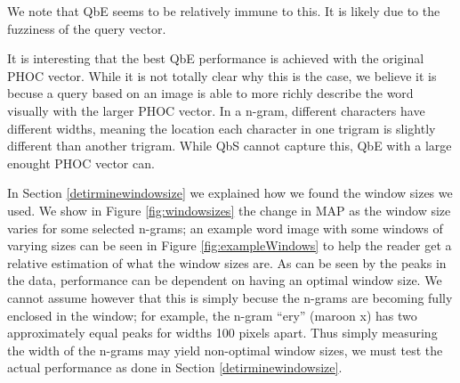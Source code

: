 \documentclass[ms,electronic,twosidetoc,letterpaper,chaptercenter,parttop,lof,lot]{byumsphd}
\begin{document}
We note that QbE seems to be relatively immune to this. It is likely due to the fuzziness of the query vector.


It is interesting that the best QbE performance is achieved with the original PHOC vector. While it is not totally clear why this is the case, we believe it is becuse a query based on an image is able to more richly describe the word visually with the larger PHOC vector. In a n-gram, different characters have different widths, meaning the location each character in one trigram is slightly different than another trigram. While QbS cannot capture this, QbE with a large enought PHOC vector can.



In Section \ref{detirminewindowsize} we explained how we found the window sizes we used. We show in Figure \ref{fig:windowsizes} the change in MAP as the window size varies for some selected n-grams; an example word image with some windows of varying sizes can be seen in Figure \ref{fig:exampleWindows} to help the reader get a relative estimation of what the window sizes are. As can be seen by the peaks in the data, performance can be dependent on having an optimal window size. We cannot assume however that this is simply becuse the n-grams are becoming fully enclosed in the window; for example, the n-gram ``ery'' (maroon x) has two approximately equal peaks for widths 100 pixels apart. Thus simply measuring the width of the n-grams may yield non-optimal window sizes, we must test the actual performance as done in Section \ref{detirminewindowsize}.
\end{document}
